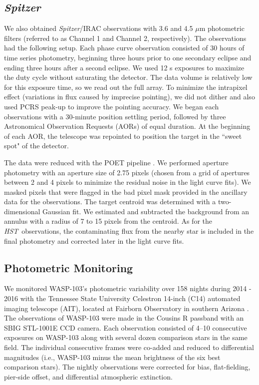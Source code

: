 \documentclass[twocolumn]{aastex61}
\newcommand{\project}[1]{\textsl{#1}}
\newcommand{\HST}{\project{HST}}
\newcommand{\Spitzer}{\project{Spitzer}}
\begin{document}
\subsection{\Spitzer}
We also obtained \Spitzer/IRAC observations with 3.6 and 4.5 $\mu$m photometric filters (referred to as Channel 1 and Channel 2, respectively). The observations had the following setup. Each phase curve observation consisted of 30 hours of time series photometry, beginning three hours prior to one secondary eclipse and ending three hours after a second eclipse.  We used 12 s exposures to maximize the duty cycle without saturating the detector. The data volume is relatively low for this exposure time, so we read out the full array. To minimize the intrapixel effect (variations in flux caused by imprecise pointing), we did not dither and also used PCRS peak-up to improve the pointing accuracy. We began each observations with a 30-minute position settling period, followed by three Astronomical Observation Requests (AORs) of equal duration. At the beginning of each AOR, the telescope was repointed to position the target in the ``sweet spot" of the detector.

The data were reduced with the POET pipeline \citep{stevenson12}. We performed aperture photometry with an aperture size of 2.75 pixels (chosen from a grid of apertures between 2 and 4 pixels to minimize the residual noise in the light curve fits). We masked pixels that were flagged in the bad pixel mask provided in the ancillary data for the observations. The target centroid was determined with a two-dimensional Gaussian fit.  We estimated and subtracted the background from an annulus with a radius of 7 to 15 pixels from the centroid. As for the \HST\ observations, the contaminating flux from the nearby star is included in the final photometry and corrected later in the light curve fits.


\subsection{Photometric Monitoring}
We monitored WASP-103's photometric variability over 158 nights during 2014 - 2016 with the Tennessee State University Celestron 14-inch (C14) automated imaging telescope (AIT), located at Fairborn Observatory in southern Arizona \citep[see, e.g.,][]{h1999, ehf2003}.  The observations of WASP-103 were made in the Cousins R passband with an SBIG STL-1001E CCD camera.  Each observation consisted of 4--10 consecutive exposures on WASP-103 along with several dozen comparison stars in the same field. The individual consecutive frames were co-added and reduced to differential magnitudes (i.e., WASP-103 minus the mean brightness of the six best comparison stars). The nightly observations were corrected for bias, flat-fielding, pier-side offset, and differential atmospheric extinction.  
\end{document}
